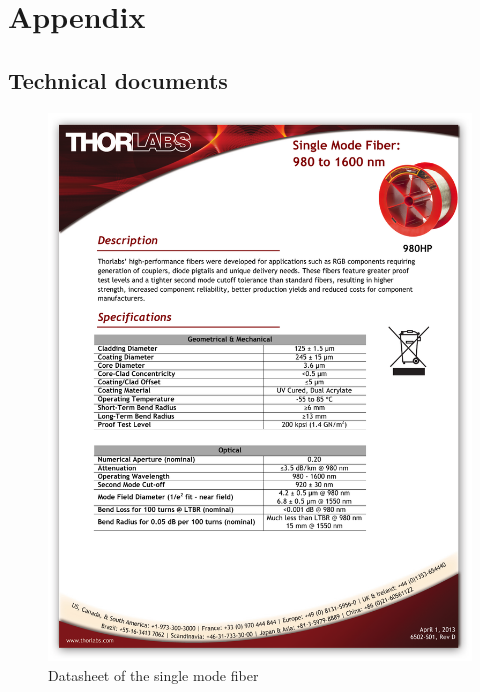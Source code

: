 \chapter{Appendix}
%
\section{Technical documents}

\begin{figure}[h!]\centering \includegraphics[width=12cm]{appendix/fiber.pdf}
      \caption{Datasheet of the single mode fiber}
\end{figure}

